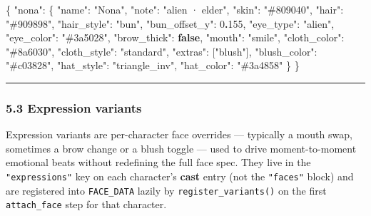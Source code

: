\documentclass[
  12pt,
  letterpaper,
]{book}
\newenvironment{Shaded}{}{}
\newcommand{\DataTypeTok}[1]{\textcolor[rgb]{0.56,0.13,0.00}{#1}}
\newcommand{\DecValTok}[1]{\textcolor[rgb]{0.25,0.63,0.44}{#1}}
\newcommand{\ErrorTok}[1]{\textcolor[rgb]{1.00,0.00,0.00}{\textbf{#1}}}
\newcommand{\FunctionTok}[1]{\textcolor[rgb]{0.02,0.16,0.49}{#1}}
\newcommand{\KeywordTok}[1]{\textcolor[rgb]{0.00,0.44,0.13}{\textbf{#1}}}
\newcommand{\OtherTok}[1]{\textcolor[rgb]{0.00,0.44,0.13}{#1}}
\newcommand{\StringTok}[1]{\textcolor[rgb]{0.25,0.44,0.63}{#1}}
\begin{document}
\begin{Shaded}
\begin{Highlighting}[]
\FunctionTok{\{}
  \DataTypeTok{"nona"}\FunctionTok{:} \FunctionTok{\{}
    \DataTypeTok{"name"}\FunctionTok{:}         \StringTok{"Nona"}\FunctionTok{,}
    \DataTypeTok{"note"}\FunctionTok{:}         \StringTok{"alien · elder"}\FunctionTok{,}
    \DataTypeTok{"skin"}\FunctionTok{:}         \StringTok{"\#809040"}\FunctionTok{,}
    \DataTypeTok{"hair"}\FunctionTok{:}         \StringTok{"\#909898"}\FunctionTok{,}
    \DataTypeTok{"hair\_style"}\FunctionTok{:}   \StringTok{"bun"}\FunctionTok{,}
    \DataTypeTok{"bun\_offset\_y"}\FunctionTok{:} \DecValTok{0}\ErrorTok{.}\DecValTok{155}\FunctionTok{,}
    \DataTypeTok{"eye\_type"}\FunctionTok{:}     \StringTok{"alien"}\FunctionTok{,}
    \DataTypeTok{"eye\_color"}\FunctionTok{:}    \StringTok{"\#3a5028"}\FunctionTok{,}
    \DataTypeTok{"brow\_thick"}\FunctionTok{:}   \KeywordTok{false}\FunctionTok{,}
    \DataTypeTok{"mouth"}\FunctionTok{:}        \StringTok{"smile"}\FunctionTok{,}
    \DataTypeTok{"cloth\_color"}\FunctionTok{:}  \StringTok{"\#8a6030"}\FunctionTok{,}
    \DataTypeTok{"cloth\_style"}\FunctionTok{:}  \StringTok{"standard"}\FunctionTok{,}
    \DataTypeTok{"extras"}\FunctionTok{:}       \OtherTok{[}\StringTok{"blush"}\OtherTok{]}\FunctionTok{,}
    \DataTypeTok{"blush\_color"}\FunctionTok{:}  \StringTok{"\#c03828"}\FunctionTok{,}
    \DataTypeTok{"hat\_style"}\FunctionTok{:}    \StringTok{"triangle\_inv"}\FunctionTok{,}
    \DataTypeTok{"hat\_color"}\FunctionTok{:}    \StringTok{"\#3a4858"}
  \FunctionTok{\}}
\FunctionTok{\}}
\end{Highlighting}
\end{Shaded}

\begin{center}\rule{0.5\linewidth}{0.5pt}\end{center}

\subsubsection{5.3 Expression variants}\label{expression-variants}

Expression variants are per-character face overrides --- typically a
mouth swap, sometimes a brow change or a blush toggle --- used to drive
moment-to-moment emotional beats without redefining the full face spec.
They live in the \texttt{"expressions"} key on each character's
\textbf{cast} entry (not the \texttt{"faces"} block) and are registered
into \texttt{FACE\_DATA} lazily by \texttt{register\_variants()} on the
first \texttt{attach\_face} step for that character.
\end{document}
